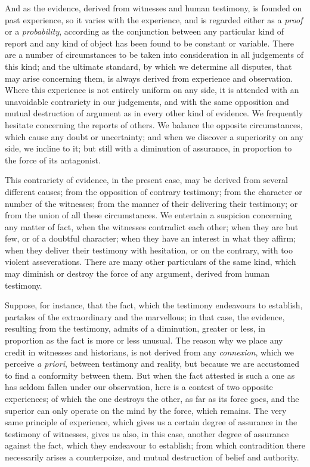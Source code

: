 \documentclass[]{article}
\begin{document}
\begin{sectionbody}
\humeparagraph  And as the evidence, derived from witnesses and human testimony, is founded on past experience, so it varies with the experience, and is regarded either as a \emph{proof} or a \emph{probability}, according as the conjunction between any particular kind of report and any kind of object has been found to be constant or variable. There are a number of circumstances to be taken into consideration in all judgements of this kind; and the ultimate standard, by which we determine all disputes, that may arise concerning them, is always derived from experience and observation. Where this experience is not entirely uniform on any side, it is attended with an unavoidable contrariety in our judgements, and with the same opposition and mutual destruction of argument as in every other kind of evidence. We frequently hesitate concerning the reports of others. We balance the opposite circumstances, which cause any doubt or uncertainty; and when we discover a superiority on any side, we incline to it; but still with a diminution of assurance, in proportion to the force of its antagonist.

\humeparagraph  This contrariety of evidence, in the present case, may be derived from several different causes; from the opposition of contrary testimony; from the character or number of the witnesses; from the manner of their delivering their testimony; or from the union of all these circumstances. We entertain a suspicion concerning any matter of fact, when the witnesses contradict each other; when they are but few, or of a doubtful character; when they have an interest in what they affirm; when they deliver their testimony with hesitation, or on the contrary, with too violent asseverations. There are many other particulars of the same kind, which may diminish or destroy the force of any argument, derived from human testimony.

\humeparagraph  Suppose, for instance, that the fact, which the testimony endeavours to establish, partakes of the extraordinary and the marvellous; in that case, the evidence, resulting from the testimony, admits of a diminution, greater or less, in proportion as the fact is more or less unusual. The reason why we place any credit in witnesses and historians, is not derived from any \emph{connexion}, which we perceive \emph{a priori}, between testimony and reality, but because we are accustomed to find a conformity between them. But when the fact attested is such a one as has seldom fallen under our observation, here is a contest of two opposite experiences; of which the one destroys the other, as far as its force goes, and the superior can only operate on the mind by the force, which remains. The very same principle of experience, which gives us a certain degree of assurance in the testimony of witnesses, gives us also, in this case, another degree of assurance against the fact, which they endeavour to establish; from which contradition there necessarily arises a counterpoize, and mutual destruction of belief and authority.


\end{sectionbody}
\end{document}
